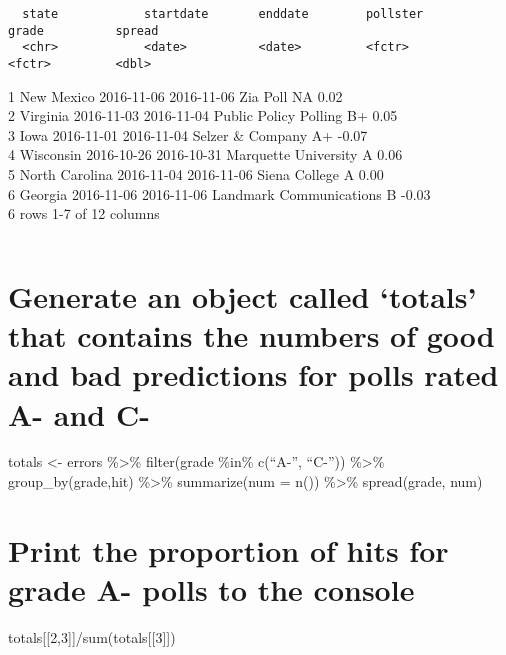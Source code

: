 \documentclass[
]{article}
\begin{document}
\begin{verbatim}
\end{verbatim}

\begin{verbatim}
  state            startdate       enddate        pollster                 grade          spread
  <chr>            <date>          <date>         <fctr>                   <fctr>         <dbl>
\end{verbatim}

1 New Mexico 2016-11-06 2016-11-06 Zia Poll NA 0.02\\
2 Virginia 2016-11-03 2016-11-04 Public Policy Polling B+ 0.05\\
3 Iowa 2016-11-01 2016-11-04 Selzer \& Company A+ -0.07\\
4 Wisconsin 2016-10-26 2016-10-31 Marquette University A 0.06\\
5 North Carolina 2016-11-04 2016-11-06 Siena College A 0.00\\
6 Georgia 2016-11-06 2016-11-06 Landmark Communications B -0.03\\
6 rows \textbar{} 1-7 of 12 columns

\begin{verbatim}
\end{verbatim}

\hypertarget{generate-an-object-called-totals-that-contains-the-numbers-of-good-and-bad-predictions-for-polls-rated-a--and-c-}{%
\section{Generate an object called `totals' that contains the numbers of
good and bad predictions for polls rated A- and
C-}\label{generate-an-object-called-totals-that-contains-the-numbers-of-good-and-bad-predictions-for-polls-rated-a--and-c-}}

totals \textless- errors \%\textgreater\% filter(grade \%in\% c(``A-'',
``C-'')) \%\textgreater\% group\_by(grade,hit) \%\textgreater\%
summarize(num = n()) \%\textgreater\% spread(grade, num)

\hypertarget{print-the-proportion-of-hits-for-grade-a--polls-to-the-console}{%
\section{Print the proportion of hits for grade A- polls to the
console}\label{print-the-proportion-of-hits-for-grade-a--polls-to-the-console}}

totals{[}{[}2,3{]}{]}/sum(totals{[}{[}3{]}{]})
\end{document}
